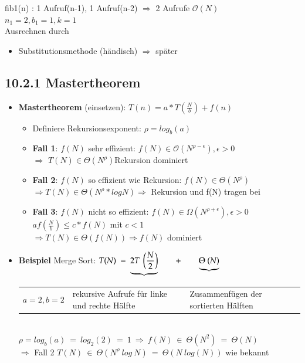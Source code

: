 \documentclass[11pt, fleqn]{scrreprt}
\newcommand{\bigO}[0]{\mathcal{O}}
\begin{document}
fib1(n) : 1 Aufruf(n-1), 1 Aufruf(n-2) $\Rightarrow$ 2 Aufrufe $\bigO{}(N)$ \\
\hspace*{5cm} $n_1 = 2, b_1 = 1, k = 1$ \\
Ausrechnen durch
\begin{itemize}
    \item Substitutionsmethode (\glqq händisch\grqq) $\Rightarrow$ später
\end{itemize}
    \subsection*{10.2.1 Mastertheorem}
    \begin{itemize}
    \item \textbf{Mastertheorem} (einsetzen): $T(n) = a* T\left(\frac{N}{b}\right) + f(n)$
    \begin{itemize}[label={}]
        \item Definiere Rekursionsexponent: $\rho = log_b(a)$
        \item \textbf{Fall 1}: $f(N)$ sehr effizient: $f(N) \in \bigO{}(N^{\rho-\epsilon}), \epsilon > 0$ \\
        $\Rightarrow$ $T(N) \in \Theta(N^\rho)$Rekursion dominiert
        \item \textbf{Fall 2}: $f(N)$ so effizient wie Rekursion: $f(N) \in \Theta(N^\rho)$ \\
        $\Rightarrow T(N) \in \Theta(N^\rho * logN) \Rightarrow$ Rekursion und f(N) tragen bei
        \item \textbf{Fall 3}: $f(N)$ nicht so effizient: $f(N) \in \Omega(N^{\rho + \epsilon}), \epsilon > 0$ \\
        \hspace*{5cm} $a f\left(\frac{N}{b}\right) \leq c* f(N)$ mit $c < 1$ \\
        $\Rightarrow T(N) \in \Theta(f(N)) \Rightarrow f(N)$ dominiert
    \end{itemize}
    \item \textbf{Beispiel} Merge Sort: $T(N)\ =\ \underbrace{2 T \ \left(\frac{N}{2}\right)}\hspace*{0.7cm} +\hspace*{0.7cm} \underbrace{\Theta\ (N)}$\\
    \begin{tabular}{L{4cm} L{3cm} L{3cm}}
        $a=2, b=2$ & rekursive Aufrufe für linke und rechte Hälfte & Zusammenfügen der sortierten Hälften\\
    \end{tabular}\\
    \hspace*{1cm} $\rho = log_b(a) \ = \ log_2(2) \ = \ 1 \ \Rightarrow \ f(N)\ \in \ \Theta(N^2) \ = \ \Theta(N)$\\
    $\Rightarrow$ Fall 2  \hspace*{1cm} $T(N)\  \in\  \Theta(N^{\rho}\ log\ N)\ =\ \boxed{\Theta(N\ log(N))}$ wie bekannt
\end{itemize}
\end{document}
